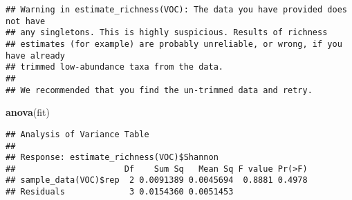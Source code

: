 \documentclass[]{article}
\newenvironment{Shaded}{\begin{snugshade}}{\end{snugshade}}
\newcommand{\KeywordTok}[1]{\textcolor[rgb]{0.13,0.29,0.53}{\textbf{#1}}}
\newcommand{\StringTok}[1]{\textcolor[rgb]{0.31,0.60,0.02}{#1}}
\newcommand{\CommentTok}[1]{\textcolor[rgb]{0.56,0.35,0.01}{\textit{#1}}}
\newcommand{\OperatorTok}[1]{\textcolor[rgb]{0.81,0.36,0.00}{\textbf{#1}}}
\newcommand{\NormalTok}[1]{#1}
\begin{document}
\begin{Shaded}
\end{Shaded}

\begin{verbatim}
## Warning in estimate_richness(VOC): The data you have provided does not have
## any singletons. This is highly suspicious. Results of richness
## estimates (for example) are probably unreliable, or wrong, if you have already
## trimmed low-abundance taxa from the data.
## 
## We recommended that you find the un-trimmed data and retry.
\end{verbatim}

\begin{Shaded}
\begin{Highlighting}[]
\KeywordTok{anova}\NormalTok{(fit)}
\end{Highlighting}
\end{Shaded}

\begin{verbatim}
## Analysis of Variance Table
## 
## Response: estimate_richness(VOC)$Shannon
##                      Df    Sum Sq   Mean Sq F value Pr(>F)
## sample_data(VOC)$rep  2 0.0091389 0.0045694  0.8881 0.4978
## Residuals             3 0.0154360 0.0051453
\end{verbatim}
\end{document}
